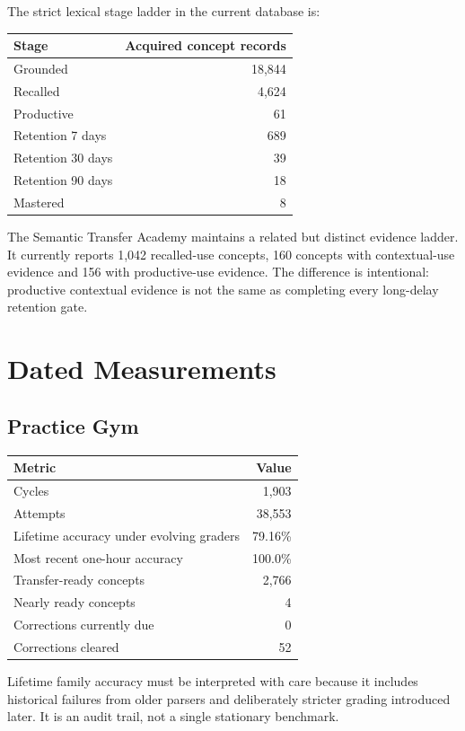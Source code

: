 \documentclass[11pt,a4paper]{article}
\begin{document}
The strict lexical stage ladder in the current database is:

\begin{center}
\begin{tabular}{lr}
\toprule
Stage & Acquired concept records \\
\midrule
Grounded & 18,844 \\
Recalled & 4,624 \\
Productive & 61 \\
Retention 7 days & 689 \\
Retention 30 days & 39 \\
Retention 90 days & 18 \\
Mastered & 8 \\
\bottomrule
\end{tabular}
\end{center}

The Semantic Transfer Academy maintains a related but distinct evidence ladder. It currently
reports 1,042 recalled-use concepts, 160 concepts with contextual-use evidence and 156 with
productive-use evidence. The difference is intentional: productive contextual evidence is not
the same as completing every long-delay retention gate.

\section{Dated Measurements}

\subsection{Practice Gym}

\begin{longtable}{p{} r}
\toprule
Metric & Value \\
\midrule
\endhead
Cycles & 1,903 \\
Attempts & 38,553 \\
Lifetime accuracy under evolving graders & 79.16\% \\
Most recent one-hour accuracy & 100.0\% \\
Transfer-ready concepts & 2,766 \\
Nearly ready concepts & 4 \\
Corrections currently due & 0 \\
Corrections cleared & 52 \\
\bottomrule
\end{longtable}

Lifetime family accuracy must be interpreted with care because it includes historical failures
from older parsers and deliberately stricter grading introduced later. It is an audit trail, not a
single stationary benchmark.
\end{document}
